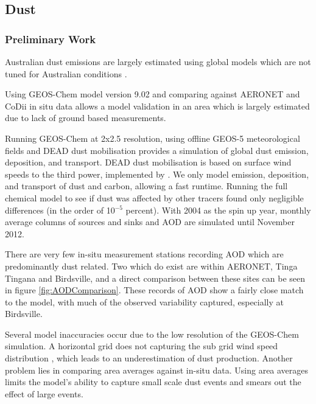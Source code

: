 \subsection{Dust}
\subsubsection{Preliminary Work}
Australian dust emissions are largely estimated using global models which are not tuned for Australian conditions \cite{Ridley_2013,Duncan_Fairlie_2007}.

Using GEOS-Chem model version 9.02 and comparing against AERONET and CoDii in situ data allows a model validation in an area which is largely estimated due to lack of ground based measurements.

Running GEOS-Chem at 2x2.5 resolution, using offline GEOS-5 meteorological fields and DEAD dust mobilisation provides a simulation of global dust emission, deposition, and transport.
DEAD dust mobilisation is based on surface wind speeds to the third power, implemented by \citet{Duncan_Fairlie_2007}.
We only model emission, deposition, and transport of dust and carbon, allowing a fast runtime.
Running the full chemical model to see if dust was affected by other tracers found only negligible differences (in the order of 10$^{-5}$ percent).
With 2004 as the spin up year, monthly average columns of sources and sinks and AOD are simulated until November 2012.

There are very few in-situ measurement stations recording AOD which are predominantly dust related.
Two which do exist are within AERONET, Tinga Tingana and Birdsville, and a direct comparison between these sites can be seen in figure \ref{fig:AODComparison}.
These records of AOD show a fairly close match to the model, with much of the observed variability captured, especially at Birdsville.

Several model inaccuracies occur due to the low resolution of the GEOS-Chem simulation.
A horizontal grid does not capturing the sub grid wind speed distribution \cite{Ridley_2013}, which leads to an underestimation of dust production.
Another problem lies in comparing area averages against in-situ data.
Using area averages limits the model's ability to capture small scale dust events and smears out the effect of large events.
